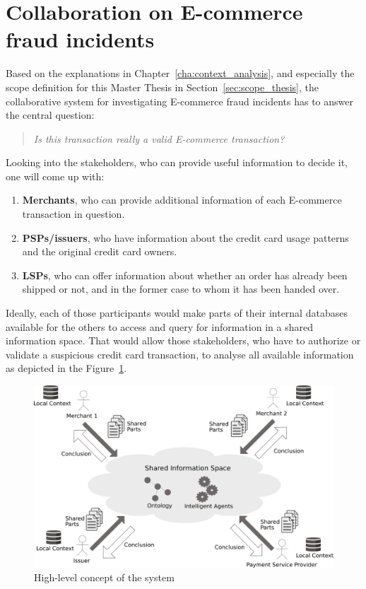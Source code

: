 
\section{Collaboration on \gls{E-commerce} fraud incidents}
\label{sec:concept_overview}

Based on the explanations in Chapter~\ref{cha:context_analysis}, and especially the scope definition for this Master Thesis in Section~\ref{sec:scope_thesis}, the collaborative system for investigating \gls{E-commerce} fraud incidents has to answer the central question:\@

\begin{quotation}
  \textit{Is this transaction really a valid \gls{E-commerce} transaction?}
\end{quotation}

Looking into the stakeholders, who can provide useful information to decide it, one will come up with:\@

\begin{enumerate}
    \item \textbf{Merchants}, who can provide additional information of each \gls{E-commerce} transaction in question.
    \item \textbf{\gls{PSP}s/issuers}, who have information about the credit card usage patterns and the original credit card owners.
    \item \textbf{\gls{LSP}s}, who can offer information about whether an order has already been shipped or not, and in the former case to whom it has been handed over.
\end{enumerate}

Ideally, each of those participants would make parts of their internal databases available for the others to access and query for information in a shared information space. That would allow those stakeholders, who have to authorize or validate a suspicious credit card transaction, to analyse all available information as depicted in the Figure~\ref{fig:images_system_overview}.\@

\begin{figure}[H]
	\centering
		\includegraphics[width=0.9\columnwidth]{images/system_overview.pdf}
	\caption{High-level concept of the system}
\label{fig:images_system_overview}
\end{figure}


